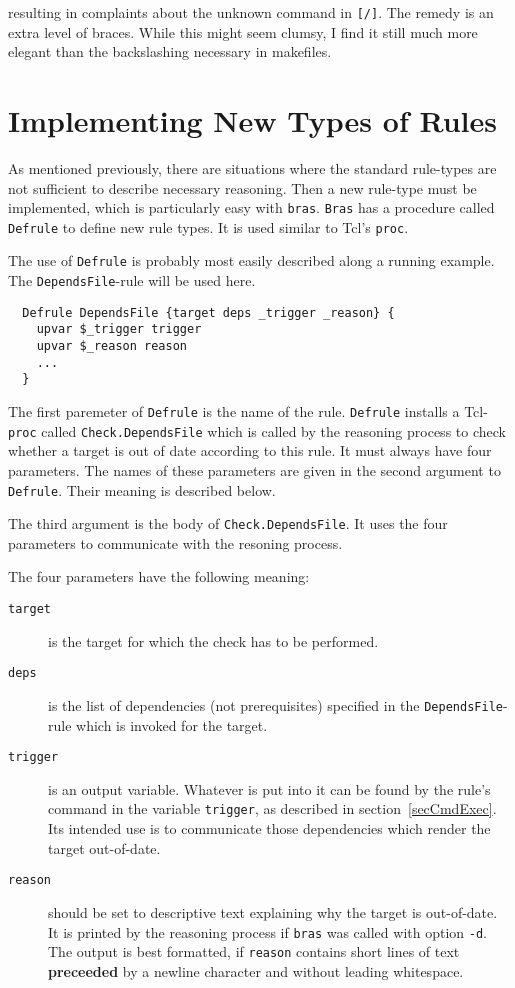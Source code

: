 \documentclass[12pt]{article}
\newcommand{\bras}{\texttt{bras}}
\newcommand{\Bras}{\texttt{Bras}}
\begin{document}
resulting in complaints about the unknown command in
\texttt{[/]}. The remedy is an extra level of braces. While this might
seem clumsy, I find it still much more elegant than the backslashing
necessary in makefiles.


\section{Implementing New Types of Rules}
\label{secNewRules}
As mentioned previously, there are situations where the standard
rule-types are not sufficient to describe necessary reasoning. Then a
new rule-type must be implemented, which is particularly easy with
\bras{}. \Bras{} has a procedure called
\texttt{Defrule} to define new rule types. It is used similar to Tcl's
\texttt{proc}.

The use of \texttt{Defrule} is probably most easily described along a
running example. The \texttt{DependsFile}-rule will be used here.
\begin{verbatim}
  Defrule DependsFile {target deps _trigger _reason} {
    upvar $_trigger trigger
    upvar $_reason reason
    ...
  }
\end{verbatim}

The first paremeter of \texttt{Defrule} is the name of the
rule. \texttt{Defrule} installs a Tcl-\texttt{proc} called
\texttt{Check.DependsFile} which is called by the reasoning process to
check whether a target is out of date according to this rule. It must
always have four parameters. The names of these parameters are given in
the second argument to \texttt{Defrule}. Their meaning is described below.

The third argument is the body of \texttt{Check.DependsFile}. It uses
the four parameters to communicate with the resoning process.

The four parameters have the following meaning:

\begin{description}
\item[\texttt{target}]
is the target for which the check has to be
performed. 

\item[\texttt{deps}]
is the list of dependencies (not prerequisites) specified in the
\texttt{DependsFile}-rule which is invoked for the target.

\item[\texttt{trigger}]
is an output variable. Whatever is put into it can be found by the
rule's command in the variable \texttt{trigger}, as described in
section~\ref{secCmdExec}. Its intended use is to communicate those
dependencies which render the target
out-of-date.

\item[\texttt{reason}] should be set to descriptive text explaining
why the target is out-of-date. It is printed by the reasoning process
if \bras{} was called with option \texttt{-d}. The output is best
formatted, if \texttt{reason} contains short lines of text
\textbf{preceeded} by a newline character and without leading
whitespace.
\end{description}
\end{document}
